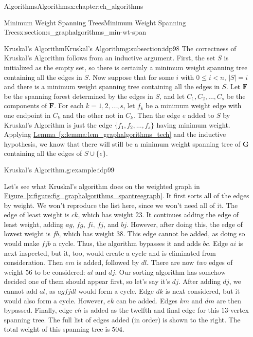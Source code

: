 \documentclass[oneside,10pt,]{book}
\newcommand{\xreffont}{\relax}
\numberwithin{equation}{section}
\newcommand{\bfG}{\mathbf{G}}
\newcommand{\bfF}{\mathbf{F}}
\newcommand{\lt}{<}
\begin{document}
\begin{chapterptx}{Algorithms}{}{Algorithms}{}{}{x:chapter:ch_algorithms}
\begin{sectionptx}{Minimum Weight Spanning Trees}{}{Minimum Weight Spanning Trees}{}{}{x:section:s_graphalgorithms_min-wt-span}
\begin{subsectionptx}{Kruskal's Algorithm}{}{Kruskal's Algorithm}{}{}{g:subsection:idp98}
The correctness of Kruskal's Algorithm follows from an inductive argument. First, the set \(S\) is initialized as the empty set, so there is certainly a minimum weight spanning tree containing all the edges in \(S\). Now suppose that for some \(i\) with \(0\le i \lt n\), \(|S|=i\) and there is a minimum weight spanning tree containing all the edges in \(S\). Let \(\bfF\) be the spanning forest determined by the edges in \(S\), and let \(C_1, C_2,\dots,C_s\) be the components of \(\bfF\). For each \(k=1,2,\dots,s\), let \(f_k\) be a minimum weight edge with one endpoint in \(C_k\) and the other not in \(C_k\). Then the edge \(e\) added to \(S\) by Kruskal's Algorithm is just the edge \(\{f_1,f_2,\dots,f_s\}\) having minimum weight. Applying \hyperref[x:lemma:lem_graphalgorithms_tech]{Lemma~{\xreffont\ref{x:lemma:lem_graphalgorithms_tech}}} and the inductive hypothesis, we know that there will still be a minimum weight spanning tree of \(\bfG\) containing all the edges of \(S\cup\{e\}\).%
\begin{example}{Kruskal's Algorithm.}{g:example:idp99}%
\begin{sidebyside}{2}{0.0125}{0.0125}{0.025}%
\begin{sbspanel}{0.78}%
Let's see what Kruskal's algorithm does on the weighted graph in \hyperref[x:figure:fig_graphalgorithms_spantreegraph]{Figure~{\xreffont\ref{x:figure:fig_graphalgorithms_spantreegraph}}}.  It first sorts all of the edges by weight. We won't reproduce the list here, since we won't need all of it. The edge of least weight is \(ck\), which has weight \(23\). It continues adding the edge of least weight, adding \(ag\), \(fg\), \(fi\), \(fj\), and \(bj\). However, after doing this, the edge of lowest weight is \(fb\), which has weight \(38\). This edge cannot be added, as doing so would make \(fjb\) a cycle. Thus, the algorithm bypasses it and adds \(bc\). Edge \(ai\) is next inspected, but it, too, would create a cycle and is eliminated from consideration. Then \(em\) is added, followed by \(dl\). There are now \emph{two} edges of weight \(56\) to be considered: \(al\) and \(dj\). Our sorting algorithm has somehow decided one of them should appear first, so let's say it's \(dj\). After adding \(dj\), we cannot add \(al\), as \(agfjdl\) would form a cycle. Edge \(dk\) is next considered, but it would also form a cycle. However, \(ek\) can be added. Edges \(km\) and \(dm\) are then bypassed. Finally, edge \(ch\) is added as the twelfth and final edge for this \(13\)-vertex spanning tree. The full list of edges added (in order) is shown to the right. The total weight of this spanning tree is \(504\).%

\end{sbspanel}
\end{sidebyside}
\end{example}
\end{subsectionptx}
\end{sectionptx}
\end{chapterptx}
\end{document}
